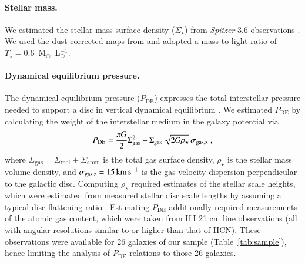 \documentclass[letter, longauth]{aa} %
\newcommand*{\hone}{\ensuremath{\text{H}\,{\scriptstyle\text{I}}}\xspace}  %
\newcommand*{\sigmol}{\ensuremath{\Sigma_{\text{mol}}}\xspace}  %
\newcommand*{\pde}{\ensuremath{P_{\text{DE}}}\xspace}  %
\newcommand*{\sigstar}{\ensuremath{\Sigma_{\star}}\xspace}  %
\newcommand*{\rhostar}{\ensuremath{\rho_{\star}}\xspace}  %
\newcommand*{\sigatom}{\ensuremath{\Sigma_{\text{atom}}}\xspace}  %
\newcommand*{\siggas}{\ensuremath{\Sigma_{\text{gas}}}\xspace}  %
\begin{document}
\paragraph{Stellar mass.}
We estimated the stellar mass surface density (\sigstar) from \textit{Spitzer} \SI{3.6}{\micron} observations \citep{Sheth2010,Querejeta2021b}. We used the dust-corrected maps from \citet{Querejeta2015} and adopted a mass-to-light ratio of $\Upsilon_\star = 0.6$~M$_\odot$~L$_\odot^{-1}$.

\paragraph{Dynamical equilibrium pressure.}
The dynamical equilibrium pressure (\pde) expresses the total interstellar pressure needed to support a disc in vertical dynamical equilibrium \citep[e.g. see][]{Ostriker2022, Schinnerer2024}. We estimated \pde by calculating the weight of the interstellar medium in the galaxy potential via\begin{align}
    \pde = \dfrac{\pi G}{2}\siggas^2 + \siggas \, \sqrt{2G\rhostar} \, \sigma_{\rm gas, z} \;,
\end{align}
where $\siggas=\sigmol + \sigatom$ is the total gas surface density, $\rhostar$ is the stellar mass volume density, and $\sigma_{\rm gas, z}=\SI{15}{\km\per\s}$ \citep[e.g.][]{Sun2018} is the gas velocity dispersion perpendicular to the galactic disc.
Computing \rhostar required estimates of the stellar scale heights, which were estimated from measured stellar disc scale lengths by assuming a typical disc flattening ratio \citep[see][for more details]{Sun2020b,Sun2022}.
Estimating \pde additionally required measurements of the atomic gas content, which were taken from \hone 21 cm line observations (all with angular resolutions similar to or higher  than that of HCN). These observations were available for 26 galaxies of our sample (Table~\ref{tab:sample}), hence limiting the analysis of \pde relations to those 26 galaxies.
\end{document}

